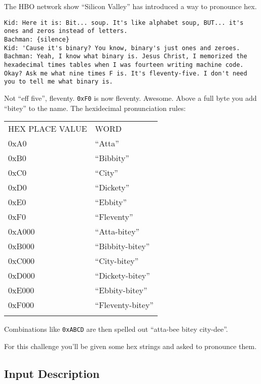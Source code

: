 The HBO network show ``Silicon Valley'' has introduced a way to
pronounce hex.

\begin{lstlisting}
Kid: Here it is: Bit... soup. It's like alphabet soup, BUT... it's ones and zeros instead of letters.
Bachman: {silence}
Kid: 'Cause it's binary? You know, binary's just ones and zeroes.
Bachman: Yeah, I know what binary is. Jesus Christ, I memorized the hexadecimal times tables when I was fourteen writing machine code. Okay? Ask me what nine times F is. It's fleventy-five. I don't need you to tell me what binary is.
\end{lstlisting}

Not ``eff five'', fleventy. \texttt{0xF0} is now fleventy. Awesome.
Above a full byte you add ``bitey'' to the name. The hexidecimal
pronunciation rules:

\begin{longtable}[c]{@{}ll@{}}
\toprule\addlinespace
HEX PLACE VALUE & WORD
\\\addlinespace
\midrule\endhead
0xA0 & ``Atta''
\\\addlinespace
0xB0 & ``Bibbity''
\\\addlinespace
0xC0 & ``City''
\\\addlinespace
0xD0 & ``Dickety''
\\\addlinespace
0xE0 & ``Ebbity''
\\\addlinespace
0xF0 & ``Fleventy''
\\\addlinespace
0xA000 & ``Atta-bitey''
\\\addlinespace
0xB000 & ``Bibbity-bitey''
\\\addlinespace
0xC000 & ``City-bitey''
\\\addlinespace
0xD000 & ``Dickety-bitey''
\\\addlinespace
0xE000 & ``Ebbity-bitey''
\\\addlinespace
0xF000 & ``Fleventy-bitey''
\\\addlinespace
\bottomrule
\end{longtable}

Combinations like \texttt{0xABCD} are then spelled out ``atta-bee bitey
city-dee''.

For this challenge you'll be given some hex strings and asked to
pronounce them.

\subsection*{Input Description}\label{input-description-5}

